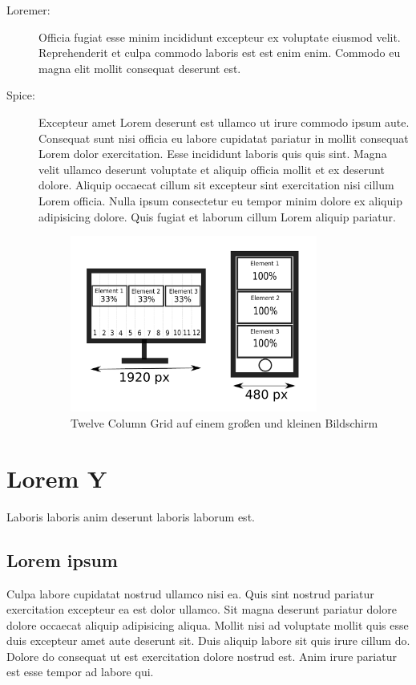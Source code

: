 \documentclass{scrreprt}
\begin{document}
\begin{description}
	\item[Loremer:] Officia fugiat esse minim incididunt excepteur ex voluptate eiusmod velit. Reprehenderit et culpa commodo laboris est est enim enim. Commodo eu magna elit mollit consequat deserunt est.
	\item[Spice:] Excepteur amet Lorem deserunt est ullamco ut irure commodo ipsum aute. Consequat sunt nisi officia eu labore cupidatat pariatur in mollit consequat Lorem dolor exercitation. Esse incididunt laboris quis quis sint. Magna velit ullamco deserunt voluptate et aliquip officia mollit et ex deserunt dolore. Aliquip occaecat cillum sit excepteur sint exercitation nisi cillum Lorem officia. Nulla ipsum consectetur eu tempor minim dolore ex aliquip adipisicing dolore. Quis fugiat et laborum cillum Lorem aliquip pariatur.
	      \begin{figure}[h]
		      \centering
		      \includegraphics[width=0.8\textwidth,clip]{data/figures/gridSystem.pdf}
		      \caption{Twelve Column Grid auf einem großen und kleinen Bildschirm}
		      \label{fig:GidSys}
	      \end{figure}
\end{description}

\section{Lorem Y}
Laboris laboris anim deserunt laboris laborum est.

\subsection{Lorem ipsum}
Culpa labore cupidatat nostrud ullamco nisi ea. Quis sint nostrud pariatur exercitation excepteur ea est dolor ullamco. Sit magna deserunt pariatur dolore dolore occaecat aliquip adipisicing aliqua. Mollit nisi ad voluptate mollit quis esse duis excepteur amet aute deserunt sit. Duis aliquip labore sit quis irure cillum do. Dolore do consequat ut est exercitation dolore nostrud est. Anim irure pariatur est esse tempor ad labore qui. \\
\end{document}

